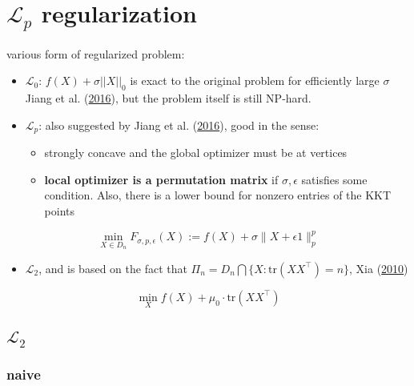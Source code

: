 \documentclass[
  10pt,
  a4paper,
,tablecaptionabove
]{scrartcl}
\providecommand{\tightlist}{%
  \setlength{\itemsep}{0pt}\setlength{\parskip}{0pt}}
\begin{document}
\hypertarget{mathscr-l_p-regularization}{%
\section{\texorpdfstring{\(\mathscr L_p\)
regularization}{\textbackslash mathscr L\_p regularization}}\label{mathscr-l_p-regularization}}

various form of regularized problem:

\begin{itemize}
\item
  \(\mathscr L_0\): \(f(X) + \sigma ||X||_0\) is exact to the original
  problem for efficiently large \(\sigma\) Jiang et al.
  (\protect\hyperlink{ref-jiang_l_p-norm_2016}{2016}), but the problem
  itself is still NP-hard.
\item
  \(\mathscr L_p\): also suggested by Jiang et al.
  (\protect\hyperlink{ref-jiang_l_p-norm_2016}{2016}), good in the
  sense:

  \begin{itemize}
  \tightlist
  \item
    strongly concave and the global optimizer must be at vertices
  \item
    \textbf{local optimizer is a permutation matrix} if
    \(\sigma, \epsilon\) satisfies some condition. Also, there is a
    lower bound for nonzero entries of the KKT points
  \end{itemize}
\end{itemize}

\[\min _{X \in D _{n}} F_{\sigma, p, \epsilon}(X):=f(X)+\sigma\|X+\epsilon 1 \|_{p}^{p}\]

\begin{itemize}
\tightlist
\item
  \(\mathscr L_2\), and is based on the fact that
  \(\Pi_n = D_n \bigcap \{X:\textrm{tr}(XX^\top) = n\}\), Xia
  (\protect\hyperlink{ref-xia_efficient_2010}{2010})
\end{itemize}

\[\min_Xf(X)+\mu_{0} \cdot \textrm{tr} \left(X X^{\top}\right)\]

\hypertarget{mathscr-l_2}{%
\subsection{\texorpdfstring{\(\mathscr L_2\)}{\textbackslash mathscr L\_2}}\label{mathscr-l_2}}

\hypertarget{naive}{%
\subsubsection{naive}\label{naive}}
\end{document}
